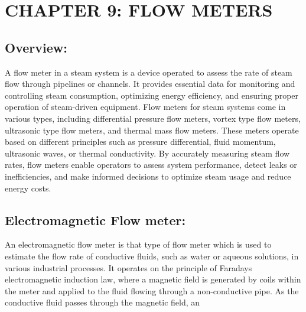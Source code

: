\section{CHAPTER 9: FLOW METERS}

\subsection{Overview:}

A flow meter in a steam system is a device operated to assess the rate
of steam flow through pipelines or channels. It provides essential data
for monitoring and controlling steam consumption, optimizing energy
efficiency, and ensuring proper operation of steam-driven equipment.
Flow meters for steam systems come in various types, including
differential pressure flow meters, vortex type flow meters, ultrasonic
type flow meters, and thermal mass flow meters. These meters operate
based on different principles such as pressure differential, fluid
momentum, ultrasonic waves, or thermal conductivity. By accurately
measuring steam flow rates, flow meters enable operators to assess
system performance, detect leaks or inefficiencies, and make informed
decisions to optimize steam usage and reduce energy costs.

\subsection{Electromagnetic Flow meter:} An electromagnetic flow meter
is that type of flow meter which is used to estimate the flow rate of
conductive fluids, such as water or aqueous solutions, in various
industrial processes. It operates on the principle of
Faraday\textquotesingle s electromagnetic induction law, where a
magnetic field is generated by coils within the meter and applied to the
fluid flowing through a non-conductive pipe. As the conductive fluid
passes through the magnetic field, an

